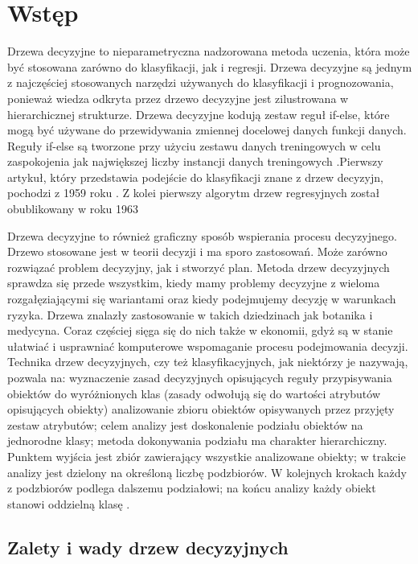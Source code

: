 \documentclass[10pt,a4paper]{article}
\begin{document}
\tableofcontents
\newpage

\section{Wstęp}
Drzewa decyzyjne to nieparametryczna nadzorowana metoda uczenia, która może być stosowana zarówno do klasyfikacji, jak i regresji. Drzewa decyzyjne są jednym z najczęściej stosowanych narzędzi używanych do klasyfikacji i prognozowania, ponieważ wiedza odkryta przez drzewo decyzyjne jest zilustrowana w hierarchicznej strukturze. Drzewa decyzyjne kodują zestaw reguł if-else, które mogą być używane do przewidywania zmiennej docelowej danych funkcji danych. Reguły if-else są tworzone przy użyciu zestawu danych treningowych w celu zaspokojenia jak największej liczby instancji danych treningowych \cite{MazumdarWWW, Quinlan1986}.Pierwszy artykuł, który przedstawia podejście do klasyfikacji znane z drzew decyzyjn, pochodzi z 1959 roku \cite{Belson1959}. Z kolei pierwszy algorytm drzew regresyjnych został obublikowany w roku 1963 \cite{Morgan1963}



Drzewa decyzyjne to również graficzny sposób wspierania procesu decyzyjnego. Drzewo stosowane jest w teorii decyzji i ma sporo zastosowań. Może zarówno rozwiązać problem decyzyjny, jak i stworzyć plan. Metoda drzew decyzyjnych sprawdza się przede wszystkim, kiedy mamy problemy decyzyjne z wieloma rozgałęziającymi się wariantami oraz kiedy podejmujemy decyzję w warunkach ryzyka. Drzewa znalazły zastosowanie w takich dziedzinach jak botanika i medycyna. Coraz częściej sięga się do nich także w ekonomii, gdyż są w stanie ułatwiać i usprawniać komputerowe wspomaganie procesu podejmowania decyzji. Technika drzew decyzyjnych, czy też klasyfikacyjnych, jak niektórzy je nazywają, pozwala na: wyznaczenie zasad decyzyjnych opisujących reguły przypisywania obiektów do wyróżnionych klas (zasady odwołują się do wartości atrybutów opisujących obiekty) analizowanie zbioru obiektów opisywanych przez przyjęty zestaw atrybutów; celem analizy jest doskonalenie podziału obiektów na jednorodne klasy; metoda dokonywania podziału ma charakter hierarchiczny. Punktem wyjścia jest zbiór zawierający wszystkie analizowane obiekty; w trakcie analizy jest dzielony na określoną liczbę podzbiorów. W kolejnych krokach każdy z podzbiorów podlega dalszemu podziałowi; na końcu analizy każdy obiekt stanowi oddzielną klasę \cite{Breiman1984, Gatnar1998, Morgan1963, Quinlan1990}.

\subsection{Zalety i wady drzew decyzyjnych}
\end{document}
